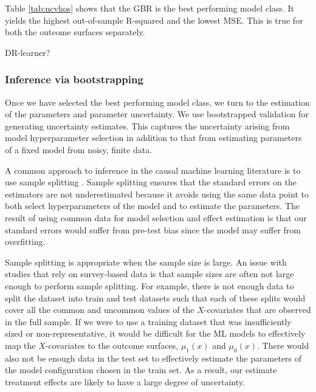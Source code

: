 \documentclass[12pt, a4paper]{article}
\begin{document}
Table \ref{tab:ncvhos} shows that the GBR is the best performing model class.
It yields the highest out-of-sample R-squared and the lowest MSE. This is true
for both the outcome surfaces separately.

DR-learner?

\subsubsection*{Inference via bootstrapping}

Once we have selected the best performing model class, we turn to the
estimation of the parameters and parameter uncertainty. We use bootstrapped
validation for generating uncertainty estimates. This captures the uncertainty
arising from model hyperparameter selection in addition to that from estimating
parameters of a fixed model from noisy, finite data. 


A common approach to inference in the causal machine learning literature is to
use sample splitting \citep{athey2019}. Sample splitting ensures that the
standard errors on the estimators are not underestimated because it avoids
using the same data point to both select hyperparameters of the model and to
estimate the parameters. 
The result of using common data for model selection and effect estimation is
that our standard errors would suffer from pre-test bias since the model may
suffer from overfitting.

Sample splitting is appropriate when the sample size is large. An issue with
studies that rely on survey-based data is that sample sizes are often not large
enough to perform sample splitting. For example, there is not enough data to
split the dataset into train and test datasets such that each of these splits
would cover all the common and uncommon values of the $X$-covariates that are
observed in the full sample. If we were to use a training dataset that was
insufficiently sized or non-representative, it would be difficult for the ML
models to effectively map the $X$-covariates to the outcome surfaces,
$\mu_1(x)$ and $\mu_0(x)$. There would also not be enough data in the test set
to effectively estimate the parameters of the model configuration chosen in the
train set. As a result, our estimate treatment effects are likely to have a
large degree of uncertainty.
\end{document}
